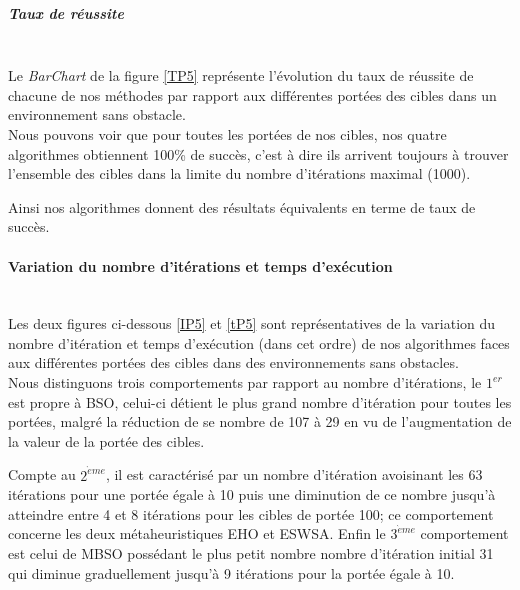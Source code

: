 \noindent
\begin{minipage}[t]{0.53\textwidth}
	\subparagraph{Taux de réussite}
	\textbf{}\\
	
	Le \textit{BarChart} de la figure \ref{TP5} représente l'évolution du taux de réussite de chacune de nos méthodes par rapport aux différentes portées des cibles dans un environnement sans obstacle.\\
	
	Nous pouvons voir que pour toutes les portées de nos cibles, nos quatre algorithmes obtiennent 100\% de succès, c'est à dire ils arrivent toujours à trouver l'ensemble des cibles dans la limite du nombre d'itérations maximal (1000).
	
	Ainsi nos algorithmes donnent des résultats équivalents en terme de taux de succès.

	
\end{minipage}\hfill
\begin{minipage}[t]{0.55\textwidth}
	\captionsetup{width=0.8\linewidth}
	\centering{}
	\vspace{-0.3cm}
	\label{TP5}
\end{minipage}\hfill

\vspace{0.3cm}

\noindent
	\paragraph{Variation du nombre d'itérations et temps d'exécution}
	\textbf{ }\\
	
	Les deux figures ci-dessous \ref{IP5} et \ref{tP5} sont représentatives de la variation du nombre d'itération et temps d'exécution (dans cet ordre) de nos algorithmes faces aux différentes portées des cibles dans des environnements sans obstacles.\\
	
	Nous distinguons trois comportements par rapport au nombre d'itérations, le $1^{er}$ est propre à BSO, celui-ci détient le plus grand nombre d'itération pour toutes les portées, malgré la réduction de se nombre de 107 à 29 en vu de l'augmentation de la valeur de la portée des cibles. 
	
	Compte au $2^{\grave{e}me}$, il est caractérisé par un nombre d'itération avoisinant les 63 itérations pour une portée égale à 10 puis une diminution de ce nombre jusqu'à atteindre entre 4 et 8 itérations pour les cibles de portée 100; ce comportement concerne les deux métaheuristiques EHO et ESWSA.
	Enfin le $3^{\grave{e}me}$ comportement est celui de MBSO possédant le plus petit nombre nombre d'itération initial 31 qui diminue graduellement jusqu'à 9 itérations pour la portée égale à 10.\\
	
